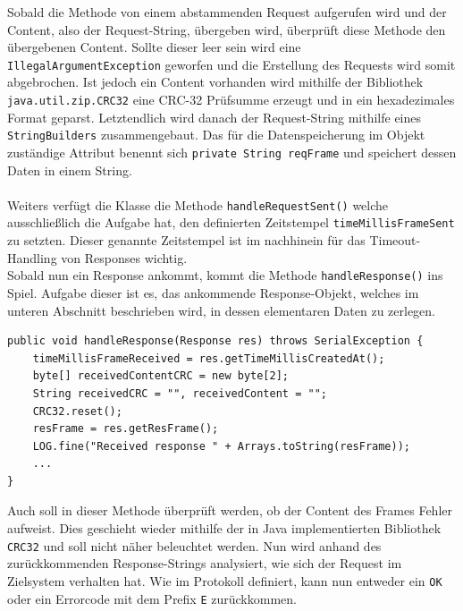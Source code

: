 Sobald die Methode von einem abstammenden Request aufgerufen wird und der Content, also der Request-String, übergeben wird, überprüft diese Methode den übergebenen Content.
Sollte dieser leer sein wird eine \lstinline[style=java]{IllegalArgumentException} geworfen und die Erstellung des Requests wird somit abgebrochen.
Ist jedoch ein Content vorhanden wird mithilfe der Bibliothek \lstinline{java.util.zip.CRC32} eine CRC-32 Prüfsumme erzeugt und in ein hexadezimales Format geparst.
Letztendlich wird danach der Request-String mithilfe eines \lstinline{StringBuilders} zusammengebaut.
Das für die Datenspeicherung im Objekt zuständige Attribut benennt sich \lstinline[style=java]{private String reqFrame} und speichert dessen Daten in einem String.\\\\
Weiters verfügt die Klasse die Methode \lstinline[style=java]{handleRequestSent()} welche ausschließlich die Aufgabe hat, den definierten Zeitstempel \lstinline[style=java]{timeMillisFrameSent} zu setzten.
Dieser genannte Zeitstempel ist im nachhinein für das Timeout-Handling von Responses wichtig.\\
Sobald nun ein Response ankommt, kommt die Methode \lstinline[style=java]{handleResponse()} ins Spiel.
Aufgabe dieser ist es, das ankommende Response-Objekt, welches im unteren Abschnitt beschrieben wird, in dessen elementaren Daten zu zerlegen.
%
\begin{lstlisting}[style=java,caption=Teilabschnitt Methode handleResponse(),label=handleResponse() Teilabschnitt]
public void handleResponse(Response res) throws SerialException {
    timeMillisFrameReceived = res.getTimeMillisCreatedAt();
    byte[] receivedContentCRC = new byte[2];
    String receivedCRC = "", receivedContent = "";
    CRC32.reset();
    resFrame = res.getResFrame();
    LOG.fine("Received response " + Arrays.toString(resFrame));
    ...
}
\end{lstlisting}
Auch soll in dieser Methode überprüft werden, ob der Content des Frames Fehler aufweist.
Dies geschieht wieder mithilfe der in Java implementierten Bibliothek \lstinline{CRC32} und soll nicht näher beleuchtet werden.
Nun wird anhand des zurückkommenden Response-Strings analysiert, wie sich der Request im Zielsystem verhalten hat.
Wie im Protokoll definiert, kann nun entweder ein \lstinline[style=java]{OK} oder ein Errorcode mit dem Prefix \lstinline[style=java]{E} zurückkommen.

